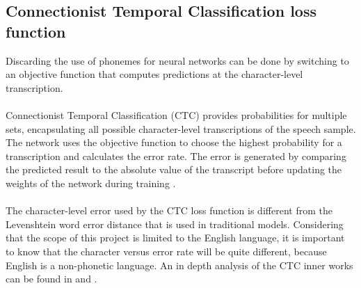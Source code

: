 \subsection{Connectionist Temporal Classification loss function}
 Discarding the use of phonemes for neural networks can be done by switching to an
 objective function that computes predictions at the character-level transcription.\\\\
Connectionist Temporal Classification (CTC) provides probabilities for multiple sets, encapsulating all possible character-level transcriptions of the speech sample.
The network uses the objective function to choose the highest probability for a transcription and calculates the error rate. The error is generated by comparing the
predicted result to the absolute value of the transcript before updating the weights of the network during training \cite{Great}.\\\\
The character-level error used by the CTC loss function is different from the Levenshtein \cite{stratonovich1960conditional} word error distance that is used in traditional models. Considering that the scope of this project is limited to the English language, it is important to know
that the character versus error rate will be quite different, because English is a non-phonetic language. An in depth analysis of the CTC inner works can be found in \cite{CTC1} and \cite{CTC2}. 